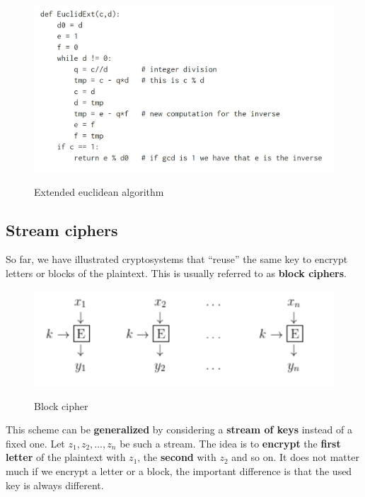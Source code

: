 \begin{figure}[h!]
        \centering
        \includegraphics[scale = 0.9]{img/eu2.jpg}
        \label{eu2}
        \caption{Extended euclidean algorithm}
\end{figure}


\subsection{Stream ciphers}
So far, we have illustrated cryptosystems that “reuse” the same key to encrypt letters or blocks of the plaintext. This is usually referred to as \textbf{block ciphers}.

\begin{figure}[h!]
        \centering
        \includegraphics[scale = 1.0]{img/stream1.png}
        \label{stream1}
        \caption{Block cipher}
\end{figure}

This scheme can be \textbf{generalized} by considering a \textbf{stream of keys} instead of a fixed one. Let $z_1, z_2, \ldots, z_n$ be such a stream. The idea is to \textbf{encrypt} the \textbf{first letter} of the plaintext with $z_1$, the \textbf{second} with $z_2$ and so on. It does not matter much if we encrypt a letter or a block, the important difference is that the used key is always different.

